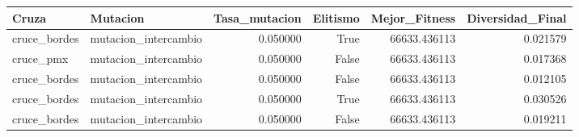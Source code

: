 \begin{tabular}{llrrrr}
\toprule
 Cruza & Mutacion & Tasa_mutacion & Elitismo & Mejor_Fitness & Diversidad_Final \\
\midrule
cruce_bordes & mutacion_intercambio & 0.050000 & True & 66633.436113 & 0.021579 \\
cruce_pmx & mutacion_intercambio & 0.050000 & False & 66633.436113 & 0.017368 \\
cruce_bordes & mutacion_intercambio & 0.050000 & False & 66633.436113 & 0.012105 \\
cruce_bordes & mutacion_intercambio & 0.050000 & True & 66633.436113 & 0.030526 \\
cruce_bordes & mutacion_intercambio & 0.050000 & False & 66633.436113 & 0.019211 \\
\bottomrule
\end{tabular}

